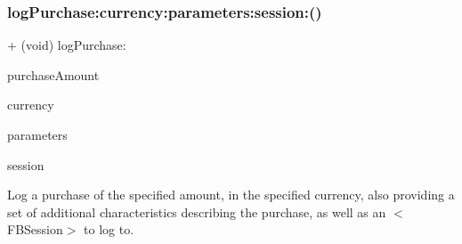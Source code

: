 \subsubsection{\texorpdfstring{log\+Purchase\+:currency\+:parameters\+:session\+:()}{logPurchase:currency:parameters:session:()}\hspace{0.1cm}{\footnotesize\ttfamily [4/5]}}
{\footnotesize\ttfamily + (void) log\+Purchase\+: \begin{DoxyParamCaption}\item[{(double)}]{purchase\+Amount }\item[{currency:(N\+S\+String $\ast$)}]{currency }\item[{parameters:(N\+S\+Dictionary $\ast$)}]{parameters }\item[{session:(\hyperlink{interfaceFBSession}{F\+B\+Session} $\ast$)}]{session }\end{DoxyParamCaption}}

Log a purchase of the specified amount, in the specified currency, also providing a set of additional characteristics describing the purchase, as well as an $<$\+F\+B\+Session$>$ to log to.


